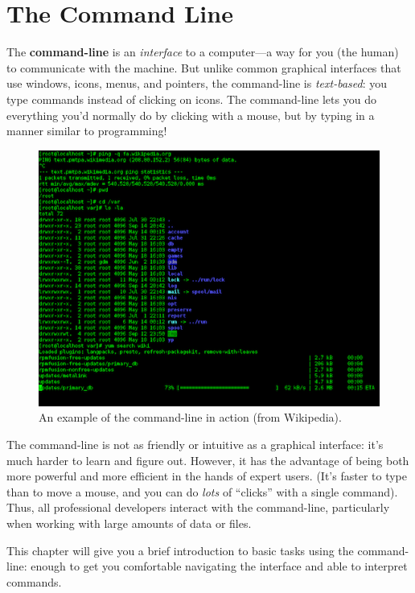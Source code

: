 \documentclass[]{book}
\theoremstyle{definition}
\theoremstyle{definition}
\theoremstyle{remark}
\begin{document}
\hypertarget{command-line}{\chapter{The Command
Line}\label{command-line}}

The \textbf{command-line} is an \emph{interface} to a computer---a way
for you (the human) to communicate with the machine. But unlike common
graphical interfaces that use windows, icons, menus, and pointers, the
command-line is \emph{text-based}: you type commands instead of clicking
on icons. The command-line lets you do everything you'd normally do by
clicking with a mouse, but by typing in a manner similar to programming!

\begin{figure}
\centering
\includegraphics{img/command-line/cli-wikipedia.png}
\caption{An example of the command-line in action (from Wikipedia).}
\end{figure}

The command-line is not as friendly or intuitive as a graphical
interface: it's much harder to learn and figure out. However, it has the
advantage of being both more powerful and more efficient in the hands of
expert users. (It's faster to type than to move a mouse, and you can do
\emph{lots} of ``clicks'' with a single command). Thus, all professional
developers interact with the command-line, particularly when working
with large amounts of data or files.

This chapter will give you a brief introduction to basic tasks using the
command-line: enough to get you comfortable navigating the interface and
able to interpret commands.
\end{document}
